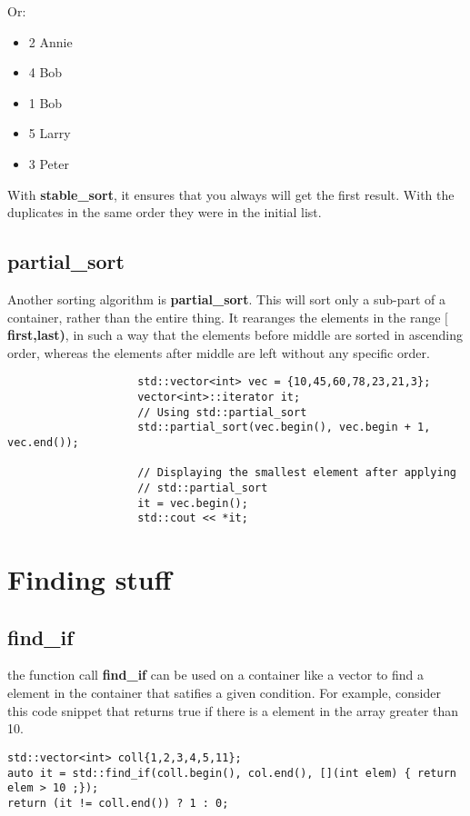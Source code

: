 \documentclass{report}
\begin{document}
                Or:
                \begin{itemize}
                    \item 2 Annie
                    \item 4 Bob
                    \item 1 Bob
                    \item 5 Larry
                    \item 3 Peter
                \end{itemize}
                With \textbf{stable\_sort}, it ensures that you always will get the first result. With the duplicates in the same order they were in the initial list.
                \subsection{partial\_sort}
                Another sorting algorithm is \textbf{partial\_sort}. This will sort only a sub-part of a container, rather than the entire thing. It rearanges the elements in the range \textbf{$\mathbf{[}$first,last)}, in such a way that the elements before middle are sorted in ascending order, whereas the elements after middle are left without any specific order.
                \begin{verbatim}
                    std::vector<int> vec = {10,45,60,78,23,21,3};
                    vector<int>::iterator it;
                    // Using std::partial_sort
                    std::partial_sort(vec.begin(), vec.begin + 1, vec.end());

                    // Displaying the smallest element after applying
                    // std::partial_sort
                    it = vec.begin();
                    std::cout << *it;
                \end{verbatim}

    \section {Finding stuff}
\subsection{find\_if}
the function call \textbf{find\_if} can be used on a container like a vector to find a element in the container that satifies a given condition. For example, consider this code snippet that returns true if there is a element in the array greater than 10.
\begin{verbatim}
std::vector<int> coll{1,2,3,4,5,11};
auto it = std::find_if(coll.begin(), col.end(), [](int elem) { return elem > 10 ;});
return (it != coll.end()) ? 1 : 0;
\end{verbatim}
\end{document}
